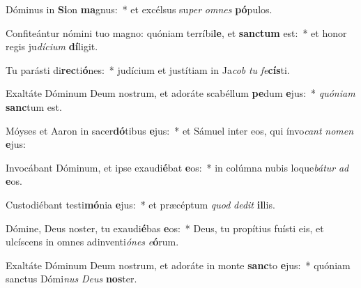 \item Dóminus in \textbf{Si}on \textbf{ma}gnus:~* et excélsus su\textit{per} \textit{om}\textit{nes} \textbf{pó}pulos.
\item Confiteántur nómini tuo magno: quóniam terríbi\textbf{le}, et \textbf{sanc}\textbf{tum} est:~* et honor regis ju\textit{dí}\textit{ci}\textit{um} \textbf{dí}ligit.
\item Tu parásti di\textbf{rec}ti\textbf{ó}nes:~* judícium et justítiam in Ja\textit{cob} \textit{tu} \textit{fe}\textbf{cís}ti.
\item Exaltáte Dóminum Deum nostrum, et adoráte scabéllum \textbf{pe}dum \textbf{e}jus:~* \textit{quón}\textit{i}\textit{am} \textbf{sanc}tum est.
\item Móyses et Aaron in sacer\textbf{dó}tibus \textbf{e}jus:~* et Sámuel inter eos, qui ínvo\textit{cant} \textit{no}\textit{men} \textbf{e}jus:
\item Invocábant Dóminum, et ipse exaudi\textbf{é}bat \textbf{e}os:~* in colúmna nubis loque\textit{bá}\textit{tur} \textit{ad} \textbf{e}os.
\item Custodiébant testi\textbf{mó}nia \textbf{e}jus:~* et præcéptum \textit{quod} \textit{de}\textit{dit} \textbf{il}lis.
\item Dómine, Deus noster, tu exaudi\textbf{é}bas \textbf{e}os:~* Deus, tu propítius fuísti eis, et ulcíscens in omnes adinventi\textit{ó}\textit{nes} \textit{e}\textbf{ó}rum.
\item Exaltáte Dóminum Deum nostrum, et adoráte in monte \textbf{sanc}to \textbf{e}jus:~* quóniam sanctus Dómi\textit{nus} \textit{De}\textit{us} \textbf{nos}ter.
